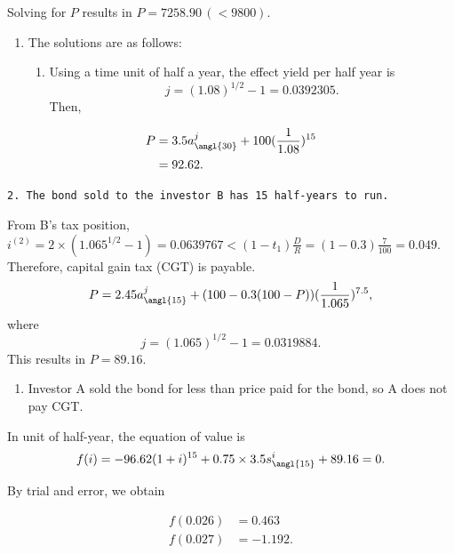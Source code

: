 \documentclass[
]{book}
\providecommand{\tightlist}{%
  \setlength{\itemsep}{0pt}\setlength{\parskip}{0pt}}
\theoremstyle{definition}
\theoremstyle{definition}
\theoremstyle{definition}
\theoremstyle{definition}
\theoremstyle{remark}
\begin{document}
Solving for \(P\) results in \(P = 7258.90 \,( <9800)\).

\begin{enumerate}
\def\labelenumi{\arabic{enumi}.}
\setcounter{enumi}{4}
\item
  The solutions are as follows:

  \begin{enumerate}
  \def\labelenumii{\arabic{enumii}.}
  \tightlist
  \item
    Using a time unit of half a year, the effect yield per half year is
    \[j = (1.08)^{1/2} - 1 = 0.0392305.\]
    Then,
  \end{enumerate}
\end{enumerate}

\[
\begin{aligned}
P &= 3.5 a^j_{\angl{30}} + 100 (\frac{1}{1.08})^{15} \\
&= 92.62.
\end{aligned}
\]

\begin{verbatim}
2. The bond sold to the investor B has 15 half-years to run.
\end{verbatim}

From B's tax position,
\(i^{(2)} = 2 \times (1.065^{1/2} - 1) = 0.0639767 < (1 - t_1)\frac{D}{R} = (1 - 0.3)\frac{7}{100} = 0.049.\)
Therefore, capital gain tax (CGT) is payable.
\[
\begin{aligned}
P &= 2.45 a^j_{\angl{15}} + (100 - 0.3(100-P)) (\frac{1}{1.065})^{7.5}, \\
\end{aligned}
\]
where \[j = (1.065)^{1/2} - 1 = 0.0319884.\]
This results in \(P = 89.16\).

\begin{enumerate}
\def\labelenumi{\arabic{enumi}.}
\setcounter{enumi}{2}
\tightlist
\item
  Investor A sold the bond for less than price paid for the bond, so A does not pay CGT.
\end{enumerate}

In unit of half-year, the equation of value is
\[ f(i) = -96.62 (1 + i)^{15} + 0.75 \times 3.5  s^i_{\angl{15}} + 89.16 = 0.\]

By trial and error, we obtain

\[
\begin{aligned}
f(0.026) &= 0.463 \\
f(0.027) &= -1.192. \\
\end{aligned}
\]
\end{document}
